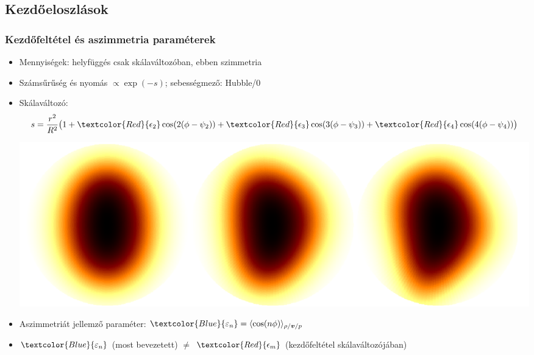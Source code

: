\documentclass{beamer}
\begin{document}
\subsection{Kezdőeloszlások}
\begin{frame}
\frametitle{Kezdőfeltétel és aszimmetria paraméterek}
\begin{itemize}
  \setlength{\itemsep}{6pt}
\item<1-> Mennyiségek: helyfüggés csak skálaváltozóban, ebben szimmetria
\item<1-> Számsűrűség és nyomás \large{$\propto \exp{(-s)}$}; sebességmező: Hubble/0
\item<1-> Skálaváltozó: 
\begin{equation*}
s=\frac{r^2}{R^2}\big(1+\textcolor{Red}{\epsilon_2}\cos(2(\phi-\psi_2))+\textcolor{Red}{\epsilon_3}\cos(3(\phi-\psi_3))+\textcolor{Red}{\epsilon_4}\cos(4(\phi-\psi_4))\big)\end{equation*}
\begin{center}
\includegraphics[scale=0.15]{pic/ic}
\end{center}
\item<1-> Aszimmetriát jellemző paraméter: $\textcolor{Blue}{\varepsilon_n}=\langle \cos(n\phi)\rangle_{\rho/\bm{v}/p}$
\item<1-> $\textcolor{Blue}{\varepsilon_n}$ (most bevezetett)  $\neq$ $\textcolor{Red}{\epsilon_m}$  (kezdőfeltétel skálaváltozójában)
\end{itemize}
\end{frame}
\end{document}
